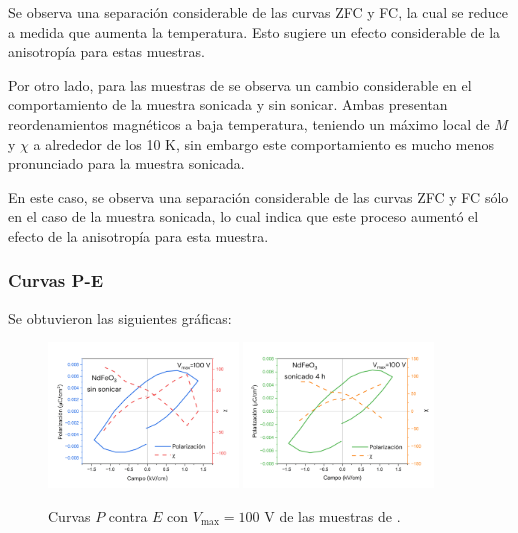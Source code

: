 \documentclass[../main.tex]{subfiles}
\begin{document}
Se observa una separación considerable de las curvas ZFC y FC, la cual se reduce a medida que aumenta la temperatura. Esto sugiere un efecto considerable de la anisotropía para estas muestras.

Por otro lado, para las muestras de \sama{} se observa un cambio considerable en el comportamiento de la muestra sonicada y sin sonicar. Ambas presentan reordenamientos magnéticos a baja temperatura, teniendo un máximo local de $M$ y $\chi$ a alrededor de los 10 K, sin embargo este comportamiento es mucho menos pronunciado para la muestra sonicada.

En este caso, se observa una separación considerable de las curvas ZFC y FC sólo en el caso de la muestra sonicada, lo cual indica que este proceso aumentó el efecto de la anisotropía para esta muestra.
\subsubsection{Curvas P-E}
Se obtuvieron las siguientes gráficas:
\begin{figure}[H]
    \centering
    \includegraphics[width=0.45\textwidth]{fig/PENdFeO3100V.png}
    \quad
    \includegraphics[width=0.45\textwidth]{fig/PENdFeO3-S100V.png}
    \caption{Curvas $P$ contra $E$ con $V_\text{max}=100$ V de las muestras de \neod{}.}
    \label{fig:nd100v}
\end{figure}
\end{document}
